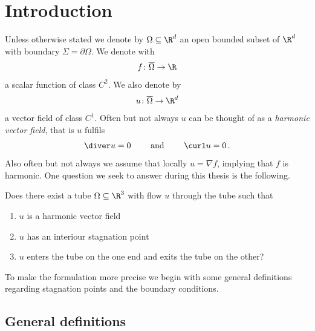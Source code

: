 \newpage

\section{Introduction}


Unless otherwise stated we denote by $\Omega\subseteq\R^d$ an open bounded subset of $\R^d$ with boundary $\Sigma=\partial\Omega$.
We denote with
\begin{align*}
  f\colon\overline{\Omega}\to\R
\end{align*}
a scalar function of class $C^2$. We also denote by
\begin{align*}
  u\colon\overline{\Omega}\to\R^d
\end{align*}
a vector field of class $C^1$. Often but not always $u$ can be thought of as 
a \emph{harmonic vector field}, that is $u$ fulfils
\begin{align*}
  \diver u=0 \qquad \text{ and }\qquad \curl u=0\,.
\end{align*}
Also often but not always we assume that locally $u=\nabla f$, implying that $f$ is harmonic.
One question we seek to answer during this thesis is the following.
\begin{question}\label{qu:flowthroughStagnationPoint}
  Does there exist a tube $\Omega\subseteq\R^3$ with flow $u$ through the tube such that
  \begin{enumerate}
    \item $u$ is a harmonic vector field
    \item $u$ has an interiour stagnation point
    \item $u$ enters the tube on the one end and exits the tube on the other?
  \end{enumerate}
\end{question}
To make the formulation more precise we begin with some general definitions regarding stagnation points and the boundary conditions.

\subsection{General definitions}

